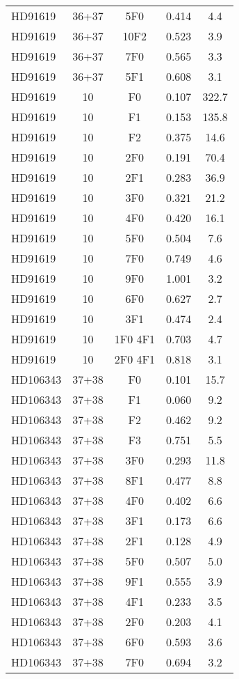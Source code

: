 \begin{table*}
\begin{tabular}{l c c c c}
HD91619 & 36+37 & 5F0 & 0.414 & 4.4\\ 
HD91619 & 36+37 & 10F2 & 0.523 & 3.9\\ 
HD91619 & 36+37 & 7F0 & 0.565 & 3.3\\ 
HD91619 & 36+37 & 5F1 & 0.608 & 3.1\\ 
\hline
HD91619 & 10 & F0 & 0.107 & 322.7\\ 
HD91619 & 10 & F1 & 0.153 & 135.8\\ 
HD91619 & 10 & F2 & 0.375 & 14.6\\ 
HD91619 & 10 & 2F0 & 0.191 & 70.4\\ 
HD91619 & 10 & 2F1 & 0.283 & 36.9\\ 
HD91619 & 10 & 3F0 & 0.321 & 21.2\\ 
HD91619 & 10 & 4F0 & 0.420 & 16.1\\ 
HD91619 & 10 & 5F0 & 0.504 & 7.6\\ 
HD91619 & 10 & 7F0 & 0.749 & 4.6\\ 
HD91619 & 10 & 9F0 & 1.001 & 3.2\\ 
HD91619 & 10 & 6F0 & 0.627 & 2.7\\ 
HD91619 & 10 & 3F1 & 0.474 & 2.4\\ 
HD91619 & 10 & 1F0 4F1 & 0.703 & 4.7\\ 
HD91619 & 10 & 2F0 4F1 & 0.818 & 3.1\\ 
\hline
HD106343 & 37+38 & F0 & 0.101 & 15.7\\ 
HD106343 & 37+38 & F1 & 0.060 & 9.2\\ 
HD106343 & 37+38 & F2 & 0.462 & 9.2\\ 
HD106343 & 37+38 & F3 & 0.751 & 5.5\\ 
HD106343 & 37+38 & 3F0 & 0.293 & 11.8\\ 
HD106343 & 37+38 & 8F1 & 0.477 & 8.8\\ 
HD106343 & 37+38 & 4F0 & 0.402 & 6.6\\ 
HD106343 & 37+38 & 3F1 & 0.173 & 6.6\\ 
HD106343 & 37+38 & 2F1 & 0.128 & 4.9\\ 
HD106343 & 37+38 & 5F0 & 0.507 & 5.0\\ 
HD106343 & 37+38 & 9F1 & 0.555 & 3.9\\ 
HD106343 & 37+38 & 4F1 & 0.233 & 3.5\\ 
HD106343 & 37+38 & 2F0 & 0.203 & 4.1\\ 
HD106343 & 37+38 & 6F0 & 0.593 & 3.6\\ 
HD106343 & 37+38 & 7F0 & 0.694 & 3.2\\ 

\end{tabular}
\end{table*}
